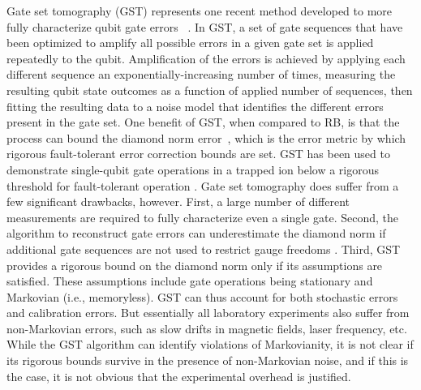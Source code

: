\documentclass[%
reprint,
 amsmath,amssymb,
]{revtex4-1}
\begin{document}
Gate set tomography (GST) represents one recent method developed to more fully characterize qubit gate errors ~\cite{BlumeKohoutGST2013}. In GST, a set of gate sequences that have been optimized to amplify all possible errors in a given gate set is applied repeatedly to the qubit. Amplification of the errors is achieved by applying each different sequence an exponentially-increasing number of times, measuring the resulting qubit state outcomes as a function of applied number of sequences, then fitting the resulting data to a noise model that identifies the different errors present in the gate set. One benefit of GST, when compared to RB, is that the process can bound the diamond norm error~\cite{blume2017demonstration}, which is the error metric by which rigorous fault-tolerant error correction bounds are set. GST has been used to demonstrate single-qubit gate operations in a trapped ion below a rigorous threshold for fault-tolerant operation \cite{blume2017demonstration}. Gate set tomography does suffer from a few significant drawbacks, however. First, a large number of different measurements are required to fully characterize even a single gate. Second, the algorithm to reconstruct gate errors can underestimate the diamond norm if additional gate sequences are not used to restrict gauge freedoms \cite{MavadiaExperimental2018}. Third, GST provides a rigorous bound on the diamond norm only if its assumptions are satisfied. These assumptions include gate operations being stationary and Markovian (i.e., memoryless). GST can thus account for both stochastic errors and calibration errors. But essentially all laboratory experiments also suffer from non-Markovian errors, such as slow drifts in magnetic fields, laser frequency, etc. While the GST algorithm can identify violations of Markovianity, it is not clear if its rigorous bounds survive in the presence of non-Markovian noise, and if this is the case, it is not obvious that the experimental overhead is justified.
\end{document}

